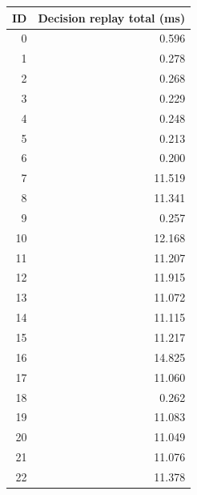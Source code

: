 \begin{tabular}{rr}
\toprule
ID & Decision replay total (ms) \\
\midrule
0 & 0.596 \\
1 & 0.278 \\
2 & 0.268 \\
3 & 0.229 \\
4 & 0.248 \\
5 & 0.213 \\
6 & 0.200 \\
7 & 11.519 \\
8 & 11.341 \\
9 & 0.257 \\
10 & 12.168 \\
11 & 11.207 \\
12 & 11.915 \\
13 & 11.072 \\
14 & 11.115 \\
15 & 11.217 \\
16 & 14.825 \\
17 & 11.060 \\
18 & 0.262 \\
19 & 11.083 \\
20 & 11.049 \\
21 & 11.076 \\
22 & 11.378 \\
\bottomrule
\end{tabular}
